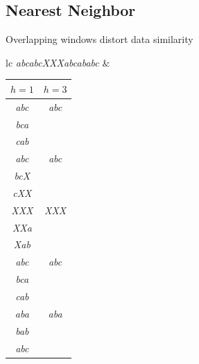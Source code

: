 \documentclass{beamer}
\begin{document}
  \subsection{Nearest Neighbor}


  \begin{frame}{Overlapping windows distort data similarity}

    \begin{tabular}{lc}
      \emph{abcabcXXXabcababc} &
      \begin{small} 
          \begin{tabular}{|c||c|}
            \hline
            $h=1$ & $h=3$ \\
            \hline
            \hline
            \emph{abc} & \emph{abc} \\
            \emph{bca} & \\
            \emph{cab} & \\
            \hline
            \emph{abc} & \emph{abc} \\
            \emph{bcX} & \\
            \emph{cXX} & \\
            \hline
            \emph{XXX} & \emph{XXX} \\
            \emph{XXa} & \\
            \emph{Xab} & \\
            \hline
            \emph{abc} & \emph{abc} \\
            \emph{bca} & \\
            \emph{cab} & \\
            \hline
            \emph{aba} & \emph{aba} \\ 
            \emph{bab} & \\
            \emph{abc} & \\
            \hline
          \end{tabular}
      \end{small}
    \end{tabular}

  \end{frame}
\end{document}
